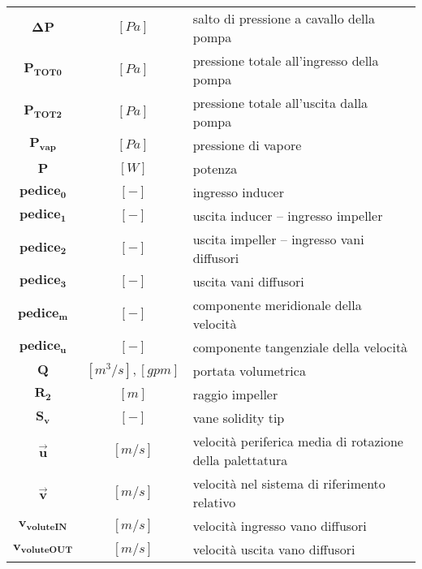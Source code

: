\begin{multicols}{2}
\begin{tabularx}{\linewidth}{cc>{\raggedright\arraybackslash}X}
		$\bm{\Delta P}$ & $[Pa]$ & salto di pressione a cavallo della pompa \\
		$\bm{P_{TOT 0}}$ & $[Pa]$ & pressione totale all'ingresso della pompa \\
                $\bm{P_{TOT 2}}$ & $[Pa]$ & pressione totale all'uscita dalla pompa \\
	        $\bm{P_{vap}}$ & $[Pa]$ & pressione di vapore \\
		$\bm{P}$ & $[W]$ & potenza \\
		$\bm{pedice_0}$ & $[-]$ & ingresso inducer \\
                $\bm{pedice_1}$ & $[-]$ & uscita inducer – ingresso impeller \\
                $\bm{pedice_2}$ & $[-]$ & uscita impeller – ingresso vani diffusori \\
		$\bm{pedice_3}$ & $[-]$ & uscita vani diffusori \\
		$\bm{pedice_m}$ & $[-]$ & componente meridionale della velocità \\
                $\bm{pedice_u}$ & $[-]$ & componente tangenziale della velocità \\
                $\bm{Q}$ & $[m^3/s], [gpm]$ & portata volumetrica \\
		$\bm{R_2}$ & $[m]$ & raggio impeller \\
		$\bm{S_v}$ & $[-]$ & vane solidity tip \\
                $\bm{\overrightarrow{u}}$ & $[m/s]$ & velocità periferica media di rotazione della palettatura \\
                $\bm{\overrightarrow{v}}$ & $[m/s]$ & velocità nel sistema di riferimento relativo \\
		$\bm{{v_{voluteIN}}}$ & $[m/s]$ & velocità ingresso vano diffusori \\
		$\bm{{v_{voluteOUT}}}$ & $[m/s]$ & velocità uscita vano diffusori
	\end{tabularx}


\end{multicols}

